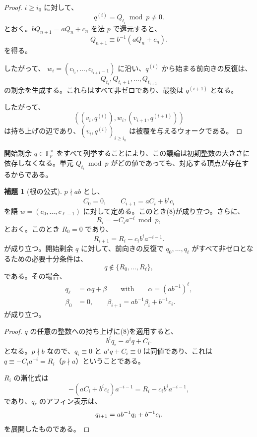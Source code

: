 \documentclass[11pt,reqno]{amsart}
\theoremstyle{definition}
\newtheorem{lemma}[theorem]{補題}
\theoremstyle{definition}
\theoremstyle{remark}
\begin{document}
\begin{proof}\leavevmode\label{proof:17}
\(i\ge i_0\) に対して、
\[
q^{(i)}=Q_{t_i}\bmod p\ne0.
\]
とおく。\(bQ_{n+1}=aQ_n+c_n\) を法 \(p\) で還元すると、
\[
Q_{n+1}\equiv b^{-1}(aQ_n+c_n).
\]
を得る。

したがって、
\(w_i=(c_{t_i},\ldots,c_{t_{i+1}-1})\)
に沿い、\(q^{(i)}\) から始まる前向きの反復は、
\[
Q_{t_i},Q_{t_i+1},\ldots,Q_{t_{i+1}}
\]
 の剰余を生成する。これらはすべて非ゼロであり、最後は \(q^{(i+1)}\) となる。

したがって、
\[
((v_i,q^{(i)}),w_i,(v_{i+1},q^{(i+1)}))
\]
は持ち上げの辺であり、\((v_i,q^{(i)})_{i\ge i_0}\) は被覆を与えるウォークである。\qedhere
\end{proof}

開始剰余 \(q\in\mathbb F_p^\times\) をすべて列挙することにより、この議論は初期整数の大きさに依存しなくなる。単元 \(Q_{t_i}\bmod p\) がどの値であっても、対応する頂点が存在するからである。

\begin{samepage}
\begin{lemma}[根の公式]\leavevmode\label{thm:18}
\(p\nmid ab\) とし、
\[
C_0=0,\qquad C_{i+1}=aC_i+b^ic_i
\]
を語 \(w=(c_0,\ldots,c_{\ell-1})\) に対して定める。このとき(8)が成り立つ。さらに、
\[
R_i=-C_ia^{-i}\bmod p,
\]
とおく。このとき \(R_0=0\) であり、
\[
R_{i+1}=R_i-c_ib^ia^{-i-1}.
\]
が成り立つ。開始剰余 \(q\) に対して、前向きの反復で \(q_0,\ldots,q_\ell\) がすべて非ゼロとなるための必要十分条件は、
\[
q\notin\{R_0,\ldots,R_\ell\},
\]
である。その場合、
\[
\begin{aligned}
q_\ell&=\alpha q+\beta\qquad \text{with}\qquad \alpha=(ab^{-1})^\ell,\\
\beta_0&=0,\qquad \beta_{i+1}=ab^{-1}\beta_i+b^{-1}c_i.
\end{aligned}
\]
が成り立つ。
\label{thm-end:18}
\end{lemma}
\end{samepage}

\begin{proof}\leavevmode\label{proof:18}
\(q\) の任意の整数への持ち上げに(8)を適用すると、
\[
b^iq_i\equiv a^iq+C_i.
\]
となる。\(p\nmid b\) なので、\(q_i\equiv0\) と \(a^iq+C_i\equiv0\) は同値であり、これは \(q\equiv-C_ia^{-i}=R_i\)（\(p\nmid a\)）ということである。

\(R_i\) の漸化式は
\[
-(aC_i+b^ic_i)a^{-i-1}=R_i-c_ib^ia^{-i-1},
\]
であり、\(q_\ell\) のアフィン表示は、
\[
q_{i+1}=ab^{-1}q_i+b^{-1}c_i.\qedhere
\]
を展開したものである。
\end{proof}
\end{document}
